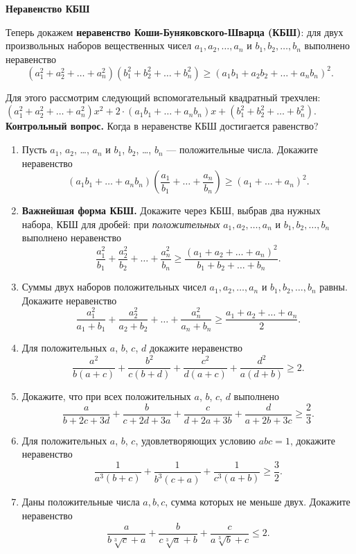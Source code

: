 \documentclass{article}
\begin{document}
\newpage 

\begin{center}
	\textbf{Неравенство КБШ}
\end{center}

Теперь докажем \textbf{неравенство Коши-Буняковского-Шварца (КБШ)}: для двух произвольных наборов вещественных чисел $a_1, a_2, \ldots, a_n$ и $b_1, b_2, \ldots, b_n$ выполнено неравенство
$$
(a_1^2+a_2^2+\ldots+a_n^2)(b_1^2+b_2^2+\ldots+b_n^2) \geqslant (a_1b_1+a_2b_2+\ldots+a_nb_n)^2.
$$

Для этого рассмотрим следующий вспомогательный квадратный трехчлен: $(a_1^2+a_2^2+\ldots+a_n^2)x^2+2\cdot(a_1b_1+\ldots+a_nb_n)x+(b_1^2+b_2^2+\ldots+b_n^2)$.
\textbf{Контрольный вопрос.} Когда в неравенстве КБШ достигается равенство?

\begin{enumerate}[label*=\protect\fbox{\arabic{enumi}}]
	
\item Пусть $a_1$, $a_2$, \dots, $a_n$ и $b_1$, $b_2$, \dots, $b_n$ ---
положительные числа. Докажите неравенство
$$ \left(a_1 b_1 +\ldots + a_n b_n \right) \left( \frac{a_1}{b_1} + \ldots + \frac{a_n}{b_n} \right) \geqslant
\left( a_1+\ldots+a_n \right)^2 .$$

\item \textbf{Важнейшая форма КБШ.} Докажите через КБШ, выбрав два нужных набора, КБШ для дробей: при \textit{положительных} $a_1, a_2, \ldots, a_n$ и $b_1, b_2, \ldots, b_n$ выполнено неравенство
$$
\frac{a_1^2}{b_1}+\frac{a_2^2}{b_2}+\ldots+\frac{a_n^2}{b_n} \geqslant \frac{(a_1+a_2+\ldots+a_n)^2}{b_1+b_2+\ldots+b_n}.
$$

\item Суммы двух наборов положительных чисел $a_1, a_2, \ldots, a_n$ и $b_1, b_2, \ldots, b_n$ равны. Докажите неравенство
$$
\frac{a_1^2}{a_1+b_1}+\frac{a_2^2}{a_2+b_2}+\ldots+\frac{a_n^2}{a_n+b_n} \geqslant \frac{a_1+a_2+\ldots+a_n}{2}.
$$

\item Для положительных $a$, $b$, $c$, $d$ докажите неравенство
$$
\frac{a^2}{b(a+c)} + \frac{b^2}{c(b+d)} + 
\frac{c^2}{d(a+c)} + \frac{d^2}{a(d+b)} \geqslant 2.
$$

\item Докажите, что при всех положительных $a$, $b$, $c$, $d$ выполнено
$$
\frac{a}{b+2c+3d} + \frac{b}{c+2d+3a} + \frac{c}{d+2a+3b} +
\frac{d}{a+2b+3c} \geqslant \frac{2}{3}.
$$


\item Для положительных $a$, $b$, $c$, удовлетворяющих условию $abc=1$, докажите неравенство
$$
\frac{1}{a^3(b+c)}+\frac{1}{b^3(c+a)}+\frac{1}{c^3(a+b)} \geqslant \frac32.
$$

\item Даны положительные числа  $a,b,c$, сумма которых не меньше двух.
Докажите неравенство
$$\frac{a}{b\sqrt [3] {c}+a}+\frac{b}{c\sqrt [3] {a}+b}+\frac{c}{a\sqrt [3] {b}+c}\leqslant 2.$$

\end{enumerate}
\end{document}
